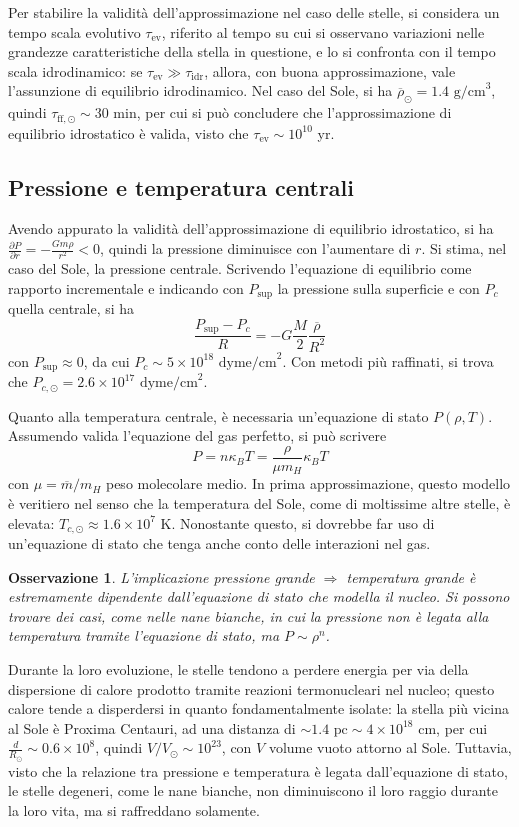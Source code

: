 \documentclass[11pt, a4paper]{scrartcl}
\theoremstyle{style}
\newtheorem{osservazione}{Osservazione}[section]
\theoremstyle{style1}
\numberwithin{equation}{subsection}
\begin{document}
Per stabilire la validit\`a dell'approssimazione nel caso delle stelle, si considera un tempo scala evolutivo $\tau _\text{ev}$, riferito al tempo su cui si osservano variazioni nelle grandezze caratteristiche della stella in questione, e lo si confronta con il tempo scala idrodinamico: se $\tau _\text{ev} \gg \tau _\text{idr}$, allora, con buona approssimazione, vale l'assunzione di equilibrio idrodinamico.
Nel caso del Sole, si ha $\overline{\rho }_\odot = 1.4 \text{ g/cm}^3$, quindi $\tau_{\text{ff},\odot} \sim 30$ min, per cui si pu\`o concludere che l'approssimazione di equilibrio idrostatico \`e valida, visto che $\tau _\text{ev}\sim 10^{10} $ yr.
\subsection{Pressione e temperatura centrali}
Avendo appurato la validit\`a dell'approssimazione di equilibrio idrostatico, si ha $\frac{\partial P}{\partial r} = -  \frac{Gm \rho }{r^2}<0$, quindi la pressione diminuisce con l'aumentare di $r$.
Si stima, nel caso del Sole, la pressione centrale. 
Scrivendo l'equazione di equilibrio come rapporto incrementale e indicando con $P_\text{sup}$ la pressione sulla superficie e con $P_c$ quella centrale, si ha
\[
	\frac{P_\text{sup} - P_c}{R} =- G \frac{M}{2} \frac{\overline{\rho }}{R^2}
\] 
con $P_\text{sup}\approx 0$, da cui $P_c\sim 5 \times 10 ^{18} \text{ dyme/cm}^2$.
Con metodi pi\`u raffinati, si trova che $P_{c,\odot} = 2.6 \times 10^{17} \text{ dyme/cm}^2 $.

Quanto alla temperatura centrale, \`e necessaria un'equazione di stato $P(\rho ,T)$.
Assumendo valida l'equazione del gas perfetto, si pu\`o scrivere 
\[
P = n \kappa _B T = \frac{\rho }{\mu  m_H} \kappa _B T 
\] 
con $\mu = \overline{m} / m_H$ peso molecolare medio.
In prima approssimazione, questo modello \`e veritiero nel senso che la temperatura del Sole, come di moltissime altre stelle, \`e elevata: $T_{c,\odot} \approx 1.6 \times 10^7 $ K.
Nonostante questo, si dovrebbe far uso di un'equazione di stato che tenga anche conto delle interazioni nel gas.
\begin{osservazione}
L'implicazione pressione grande $\Rightarrow $ temperatura grande \`e estremamente dipendente dall'equazione di stato che modella il nucleo.
Si possono trovare dei casi, come nelle nane bianche, in cui la pressione non \`e legata alla temperatura tramite l'equazione di stato, ma $P \sim \rho ^n$.
\end{osservazione}
\noindent Durante la loro evoluzione, le stelle tendono a perdere energia per via della dispersione di calore prodotto tramite reazioni termonucleari nel nucleo; questo calore tende a disperdersi in quanto fondamentalmente isolate: la stella pi\`u vicina al Sole \`e Proxima Centauri, ad una distanza di $\sim 1.4 \text{ pc} \sim 4 \times 10 ^{18}$ cm, per cui $\frac{d}{R_\odot} \sim 0.6 \times 10 ^8$, quindi $V / V_\odot \sim 10^{23}$, con $V$ volume vuoto attorno al Sole.
Tuttavia, visto che la relazione tra pressione e temperatura \`e legata dall'equazione di stato, le stelle degeneri, come le nane bianche, non diminuiscono il loro raggio durante la loro vita, ma si raffreddano solamente.
\end{document}
